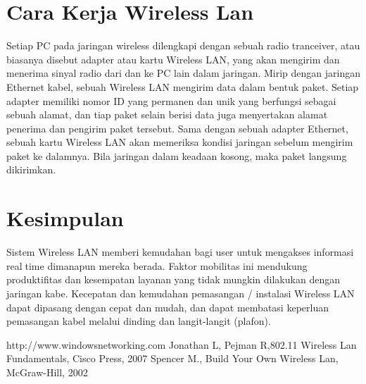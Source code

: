 \documentclass[conference]{IEEEtran}
\begin{document}
\section{Cara Kerja Wireless Lan}
Setiap PC pada jaringan wireless dilengkapi dengan sebuah radio tranceiver, atau biasanya disebut adapter atau kartu Wireless LAN, yang akan mengirim dan menerima sinyal radio dari dan ke PC lain dalam jaringan.
Mirip dengan jaringan Ethernet kabel, sebuah Wireless LAN mengirim data dalam bentuk paket. Setiap adapter memiliki nomor ID yang permanen dan unik yang berfungsi sebagai sebuah alamat, dan tiap paket selain berisi data juga menyertakan alamat penerima dan pengirim paket tersebut. Sama dengan sebuah adapter Ethernet, sebuah kartu Wireless LAN akan memeriksa kondisi jaringan sebelum mengirim paket ke dalamnya. Bila jaringan dalam keadaan kosong, maka paket langsung dikirimkan.

\section{Kesimpulan}
Sistem Wireless LAN memberi kemudahan bagi user untuk mengakses informasi realtime dimanapun mereka berada. Faktor mobilitas ini mendukung produktifitas dan kesempatan layanan yang tidak mungkin dilakukan dengan jaringan kabe. Kecepatan dan kemudahan pemasangan / instalasi Wireless LAN dapat dipasang dengan cepat dan mudah, dan dapat membatasi keperluan pemasangan kabel melalui dinding dan langit-langit (plafon).


http://www.windowsnetworking.com
Jonathan L, Pejman R,802.11 Wireless
Lan Fundamentals, Cisco Press, 2007
Spencer M., Build Your Own Wireless
Lan, McGraw-Hill, 2002

\end{document}
